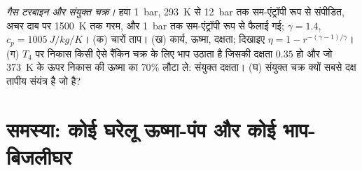 \begin{exercise}[$\star\star\star$]\label{exo:b2:open-systems:12}
\emph{गैस टरबाइन और संयुक्त चक्र।} हवा \qty{1}{bar}, \qty{293}{K} से
\qty{12}{bar} तक सम-एंट्रॉपी रूप से संपीडित, अचर दाब पर \qty{1500}{K} तक
गरम, और \qty{1}{bar} तक सम-एंट्रॉपी रूप से फैलाई गई; $\gamma = 1.4$,
$c_p = \qty{1005}{J/kg/K}$। (क) चारों ताप। (ख) कार्य,
ऊष्मा, दक्षता; दिखाइए $\eta = 1 - r^{-(\gamma - 1)/\gamma}$। (ग) $T_4$ पर
निकास किसी ऐसे रैंकिन चक्र के लिए भाप उठाता है जिसकी दक्षता $0.35$ हो
और जो \qty{373}{K} के ऊपर निकास की ऊष्मा का $70\%$ लौटा ले: संयुक्त
दक्षता। (घ) संयुक्त चक्र क्यों सबसे दक्ष तापीय
संयंत्र है जो है?
\end{exercise}

\section{समस्या: कोई घरेलू ऊष्मा-पंप और कोई भाप-बिजलीघर}


